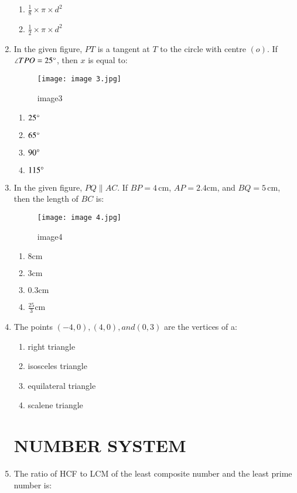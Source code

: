 \documentclass[12pt,-letter paper]{article}
\providecommand{\brak}[1]{\ensuremath{\left(#1\right)}}
\begin{document}
\begin{enumerate}
\begin{enumerate}
    \item $\frac{1}{8} \times \pi \times d^2$
    \item $\frac{1}{2} \times \pi \times d^2$
\end{enumerate}
\item In the given figure, $PT$ is a tangent at $T$ to the circle with centre $\brak{o}$. If $\angle TPO = 25\degree$, then $x$ is equal to:
\begin{figure}[!ht]
\centering
\texttt{[image: image 3.jpg]}
\label{fig:image1}
        \caption{image3}
\end{figure}
\begin{enumerate}
    \item $25\degree$
    \item $65\degree$
    \item $90\degree$
    \item $115\degree$
\end{enumerate}
\newpage
\item In the given figure, $PQ \parallel AC$. If $BP = 4 \, \mathrm{cm}$, $AP = 2.4 \mathrm{cm}$, and $BQ = 5 \, \mathrm{cm}$, then the length of $BC$ is:
\begin{figure}[!ht]
\centering
\texttt{[image: image 4.jpg]}
\label{fig:image1}                                                  \caption{image4}                                    
\end{figure}
	\begin{enumerate}
    \item $8\mathrm{cm}$
    \item $3\mathrm{cm}$
    \item $0.3 \mathrm{cm}$
    \item $\frac{25}{3}\mathrm{cm}$
\end{enumerate}
\item The points $\brak{-4,0},\brak {4,0}, and \brak{0,3}$ are the vertices of a:

\begin{enumerate}
    \item right triangle
    \item isosceles triangle
    \item equilateral triangle
    \item scalene triangle
\end{enumerate}
\begin{center}
\section*{NUMBER SYSTEM}
\end{center}
\item The ratio of HCF to LCM of the least composite number and the least prime number is:


\end{enumerate}
\end{document}

